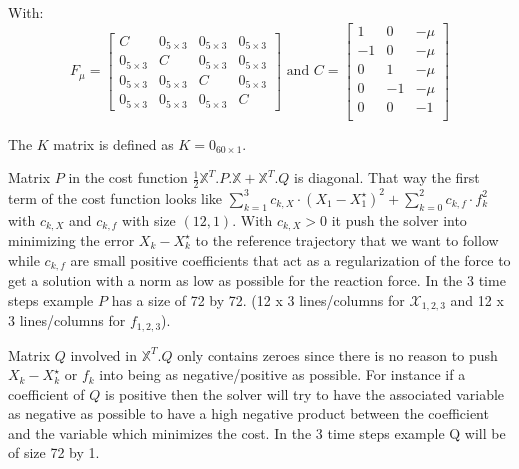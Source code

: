 \documentclass[a4paper,11pt]{article}
\begin{document}
With:
\begin{equation}
F_\mu = \begin{bmatrix} 
	C  & 0_{5\times3} & 0_{5\times3} & 0_{5\times3} \\
	0_{5\times3} & C & 0_{5\times3} & 0_{5\times3} \\
	0_{5\times3}  & 0_{5\times3} & C & 0_{5\times3} \\
	0_{5\times3}  & 0_{5\times3} & 0_{5\times3} & C
\end{bmatrix} \text{ and } C = \begin{bmatrix} 
1  & 0 & -\mu \\
-1 & 0 & -\mu \\
0  & 1 & -\mu \\
0  & -1 & -\mu \\
0  & 0 & - 1 \\
\end{bmatrix}
\end{equation}

The $K$ matrix is defined as $K = 0_{60 \times 1}$.

Matrix $P$ in the cost function $\frac{1}{2}\mathbb{X}^T.P.\mathbb{X} + \mathbb{X}^T.Q$ is diagonal. That way the first term of the cost function looks like $\sum_{k=1}^{3} c_{k,X} \cdot (X_1 - X_1^\star)^2 + \sum_{k=0}^{2} c_{k,f} \cdot f_k^2$ with $c_{k,X}$ and $c_{k,f}$ with size $(12, 1)$. With $c_{k,X} > 0$ it push the solver into minimizing the error $X_k - X_k^\star$ to the reference trajectory that we want to follow while $c_{k,f}$ are small positive coefficients that act as a regularization of the force to get a solution with a norm as low as possible for the reaction force. In the 3 time steps example $P$ has a size of 72 by 72. (12 x 3 lines/columns for $\mathcal{X}_{1,2,3}$ and 12 x 3 lines/columns for $f_{1,2,3}$).
 

Matrix $Q$ involved in $\mathbb{X}^T.Q$ only contains zeroes since there is no reason to push $X_k - X_k^\star$ or $f_k$ into being as negative/positive as possible. For instance if a coefficient of $Q$ is positive then the solver will try to have the associated variable as negative as possible to have a high negative product between the coefficient and the variable which minimizes the cost. In the 3 time steps example Q will be of size 72 by 1.
\end{document}
